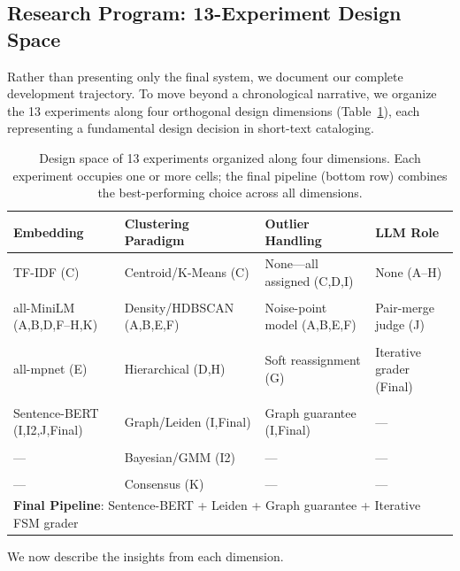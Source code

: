 \documentclass[10pt,twocolumn,twoside]{article}
\begin{document}
\subsection{Research Program: 13-Experiment Design Space}
Rather than presenting only the final system, we document our complete development trajectory. 
To move beyond a chronological narrative, we organize the 13 experiments along four orthogonal 
design dimensions (Table~\ref{tab:design_space}), each representing a fundamental design 
decision in short-text cataloging.

\begin{table}[h]
\centering
\caption{Design space of 13 experiments organized along four dimensions. Each experiment occupies 
one or more cells; the final pipeline (bottom row) combines the best-performing choice across 
all dimensions.}
\label{tab:design_space}
\small
\renewcommand{\arraystretch}{1.1}
\begin{tabular}{p{2.2cm}p{2.0cm}p{1.8cm}p{1.4cm}}
\toprule
\textbf{Embedding} & \textbf{Clustering Paradigm} & \textbf{Outlier Handling} & \textbf{LLM Role} \\
\midrule
TF-IDF (C) 
& Centroid/K-Means (C)
& None---all assigned (C,D,I)
& None (A--H) \\
& & & \\
all-MiniLM (A,B,D,F--H,K)
& Density/HDBSCAN (A,B,E,F)
& Noise-point model (A,B,E,F)
& Pair-merge judge (J) \\
& & & \\
all-mpnet (E)
& Hierarchical (D,H)
& Soft reassignment (G)
& Iterative grader (Final) \\
& & & \\
Sentence-BERT (I,I2,J,Final)
& Graph/Leiden (I,Final)
& Graph guarantee (I,Final)
& --- \\
& & & \\
--- 
& Bayesian/GMM (I2)
& ---
& --- \\
& & & \\
--- 
& Consensus (K)
& ---
& --- \\
\bottomrule
\midrule
\multicolumn{4}{l}{\textbf{Final Pipeline}: Sentence-BERT + Leiden + Graph guarantee + Iterative FSM grader} \\
\bottomrule
\end{tabular}
\end{table}

We now describe the insights from each dimension.
\end{document}
